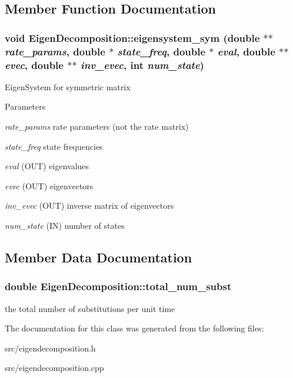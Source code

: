 \subsection{Member Function Documentation}
\hypertarget{classEigenDecomposition_a9d97980b08c8f486b7ef26afff08947f}{
\subsubsection[{eigensystem\_\-sym}]{\setlength{\rightskip}{0pt plus 5cm}void EigenDecomposition::eigensystem\_\-sym (double $\ast$$\ast$ {\em rate\_\-params}, \/  double $\ast$ {\em state\_\-freq}, \/  double $\ast$ {\em eval}, \/  double $\ast$$\ast$ {\em evec}, \/  double $\ast$$\ast$ {\em inv\_\-evec}, \/  int {\em num\_\-state})}}
\label{classEigenDecomposition_a9d97980b08c8f486b7ef26afff08947f}
EigenSystem for symmetric matrix 
\begin{DoxyParams}{Parameters}
\item[{\em rate\_\-params}]rate parameters (not the rate matrix) \item[{\em state\_\-freq}]state frequencies \item[{\em eval}](OUT) eigenvalues \item[{\em evec}](OUT) eigenvectors \item[{\em inv\_\-evec}](OUT) inverse matrix of eigenvectors \item[{\em num\_\-state}](IN) number of states \end{DoxyParams}


\subsection{Member Data Documentation}
\hypertarget{classEigenDecomposition_ad628b6f3a05b9ba605698b9814f81e6f}{
\subsubsection[{total\_\-num\_\-subst}]{\setlength{\rightskip}{0pt plus 5cm}double {\bf EigenDecomposition::total\_\-num\_\-subst}}}
\label{classEigenDecomposition_ad628b6f3a05b9ba605698b9814f81e6f}
the total number of substitutions per unit time 

The documentation for this class was generated from the following files:\begin{DoxyCompactItemize}
\item 
src/eigendecomposition.h\item 
src/eigendecomposition.cpp\end{DoxyCompactItemize}
